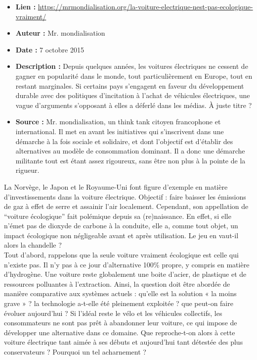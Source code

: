 \documentclass[8pt]{article}
\begin{document}
\begin{itemize}
	\item \textbf{Lien : }  \url{https://mrmondialisation.org/la-voiture-electrique-nest-pas-ecologique-vraiment/} 
	\item \textbf{Auteur :} Mr. mondialisation
	\item \textbf{Date : } 7 octobre 2015
	\item \textbf{Description : } Depuis quelques années, les voitures électriques ne cessent de gagner en popularité dans le monde, tout particulièrement en Europe, tout en restant marginales. Si certains pays s’engagent en faveur du développement durable avec des politiques d’incitation à l’achat de véhicules électriques, une vague d’arguments s’opposant à elles a déferlé dans les médias. À juste titre ?
	\item \textbf{Source : } Mr. mondialisation, un think tank citoyen francophone et international. Il met en avant les initiatives qui s'inscrivent dans une démarche à la fois sociale et solidaire, et dont l'objectif est d'établir des alternatives au modèle de consommation dominant. Il a donc une démarche militante tout est étant assez rigoureux, sans être non plus à la pointe de la rigueur.
\end{itemize}

La Norvège, le Japon et le Royaume-Uni font figure d’exemple en matière d’investissements dans la voiture électrique. Objectif : faire baisser les émissions de gaz à effet de serre et assainir l’air localement. Cependant, son appellation de “voiture écologique” fait polémique depuis sa (re)naissance. En effet, si elle n’émet pas de dioxyde de carbone à la conduite, elle a, comme tout objet, un impact écologique non négligeable avant et après utilisation. Le jeu en vaut-il alors la chandelle ? \\

Tout d’abord, rappelons que la seule voiture vraiment écologique est celle qui n’existe pas. Il n’y pas à ce jour d’alternative 100\% propre, y compris en matière d’hydrogène. Une voiture reste globalement une boite d’acier, de plastique et de ressources polluantes à l’extraction. Ainsi, la question doit être abordée de manière comparative aux systèmes actuels : qu’elle est la solution « la moins grave » ? la technologie a-t-elle été pleinement exploitée ? que peut-on faire évoluer aujourd’hui ? Si l’idéal reste le vélo et les véhicules collectifs, les consommateurs ne sont pas prêt à abandonner leur voiture, ce qui impose de développer une alternative dans ce domaine. Que reproche-t-on alors à cette voiture électrique tant aimée à ses débuts et aujourd’hui tant détestée des plus conservateurs ? Pourquoi un tel acharnement ? \\
\end{document}
